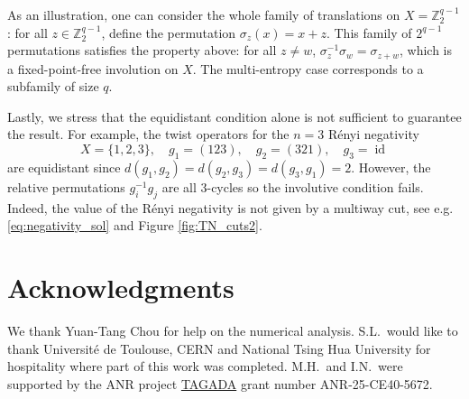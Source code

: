 \documentclass[11pt,oneside,letterpaper]{article}
\numberwithin{equation}{section}
\theoremstyle{definition}
\theoremstyle{remark}
\DeclareMathOperator{\id}{id}
\begin{document}
As an illustration, one can consider the whole family of translations on $X = \mathbb Z_2^{q-1}$: for all $z \in \mathbb Z_2^{q-1}$, define the permutation $\sigma_z(x) = x + z$. This family of $2^{q-1}$ permutations satisfies the property above: for all $z \neq w$, $\sigma_z^{-1}\sigma_w = \sigma_{z+w}$, which is a fixed-point-free involution on $X$. The multi-entropy case corresponds to a subfamily of size $q$.

Lastly, we stress that the equidistant condition alone is not sufficient to guarantee the result. For example, the twist operators for the $n=3$ R\'enyi negativity
\begin{equation}
  X=\{1,2,3\},\quad g_1 = (123),\quad g_2 = (321),\quad g_3 = \id
\end{equation}
are equidistant since $d(g_1,g_2)=d(g_2,g_3)=d(g_3,g_1) = 2$. However, the relative permutations $g_i^{-1}g_j$ are all 3-cycles so the involutive condition fails. Indeed, the value of the R\'enyi negativity is not given by a multiway cut, see e.g. \eqref{eq:negativity_sol} and Figure \ref{fig:TN_cuts2}.


\section*{Acknowledgments}
We thank Yuan-Tang Chou for help on the numerical analysis. S.L.~would like to thank Universit\'e de Toulouse, CERN and National Tsing Hua University for hospitality where part of this work was completed.
M.H.~and I.N.~were supported by the ANR project \href{https://www.ceremade.dauphine.fr/dokuwiki/anr-tagada:start}{TAGADA} grant number ANR-25-CE40-5672.

\small

 
\end{document}
